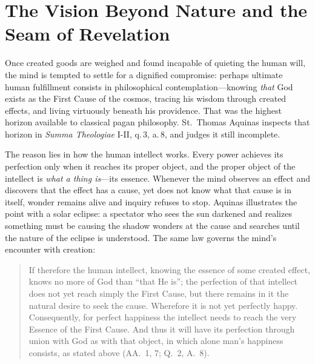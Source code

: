 \section{The Vision Beyond Nature and the Seam of Revelation}

Once created goods are weighed and found incapable of quieting the human will, the mind is tempted to settle for a dignified compromise: perhaps ultimate human fulfillment consists in philosophical contemplation---knowing \emph{that} God exists as the First Cause of the cosmos, tracing his wisdom through created effects, and living virtuously beneath his providence. That was the highest horizon available to classical pagan philosophy. St.\ Thomas Aquinas inspects that horizon in \emph{Summa Theologiae} I-II, q.\,3, a.\,8, and judges it still incomplete.

The reason lies in how the human intellect works. Every power achieves its perfection only when it reaches its proper object, and the proper object of the intellect is \emph{what a thing is}---its essence. Whenever the mind observes an effect and discovers that the effect has a cause, yet does not know what that cause is in itself, wonder remains alive and inquiry refuses to stop. Aquinas illustrates the point with a solar eclipse: a spectator who sees the sun darkened and realizes something must be causing the shadow wonders at the cause and searches until the nature of the eclipse is understood. The same law governs the mind's encounter with creation:

\begin{quote}
If therefore the human intellect, knowing the essence of some created effect, knows no more of God than ``that He is''; the perfection of that intellect does not yet reach simply the First Cause, but there remains in it the natural desire to seek the cause. Wherefore it is not yet perfectly happy. Consequently, for perfect happiness the intellect needs to reach the very Essence of the First Cause. And thus it will have its perfection through union with God as with that object, in which alone man's happiness consists, as stated above (AA.\ 1, 7; Q.\ 2, A.\ 8).
\end{quote}

